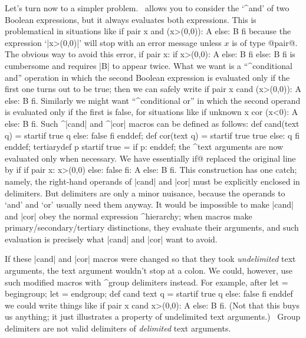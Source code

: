 Let's turn now to a simpler problem. \MF\ allows you to consider the
`^{and}' of two Boolean expressions, but it always evaluates both
expressions. This is problematical in situations like
\begintt
if pair x and (x>(0,0)): A else: B fi
\endtt
because the expression `|x>(0,0)|' will stop with an error message
unless $x$ is of type @pair@. The obvious way to avoid this error,
\begintt
if pair x:  if x>(0,0): A else: B fi  else: B fi
\endtt
is cumbersome and requires |B| to appear twice.  What we want is a
``^{conditional and}'' operation in which the second Boolean expression is
evaluated only if the first one turns out to be true; then we can safely write
\begintt
if pair x cand (x>(0,0)): A else: B fi.
\endtt
Similarly we might want ``^{conditional or}'' in which the second operand is
evaluated only if the first is false, for situations like
\begintt
if unknown x cor (x<0): A else: B fi.
\endtt
Such ^|cand| and ^|cor| macros can be defined as follows:
\begintt
def cand(text q) = startif true q else: false fi enddef;
def cor(text q) = startif true true else: q fi enddef;
tertiarydef p startif true = if p: enddef;
\endtt
the ^{text arguments} are now evaluated only when necessary. We have essentially
^^@if@ replaced the original line by
\begintt
if if pair x: x>(0,0) else: false fi: A else: B fi.
\endtt
This construction has one catch; namely, the right-hand operands of |cand| and
|cor| must be explicitly enclosed in delimiters. But delimiters are only a
minor nuisance, because the operands to `and' and `or' usually need them
anyway. It would be impossible to make |cand| and |cor| obey the normal
expression ^{hierarchy}; when macros make primary/secondary/tertiary
distinctions, they evaluate their arguments, and such evaluation is
precisely what |cand| and |cor| want to avoid.

If these |cand| and |cor| macros were changed so that they took
{\sl undelimited\/} text arguments, the text argument wouldn't stop at a colon.
We could, however, use such modified macros with ^{group delimiters}
instead. For example, after
\begintt
let {{ = begingroup; let }} = endgroup;
def cand text q = startif true q else: false fi enddef
\endtt
we could write things like
\begintt
if {{pair x cand x>(0,0)}}: A else: B fi.
\endtt
(Not that this buys us anything; it just illustrates a property of
undelimited text arguments.) \ Group delimiters
are not valid delimiters of {\sl delimited\/} text arguments.

